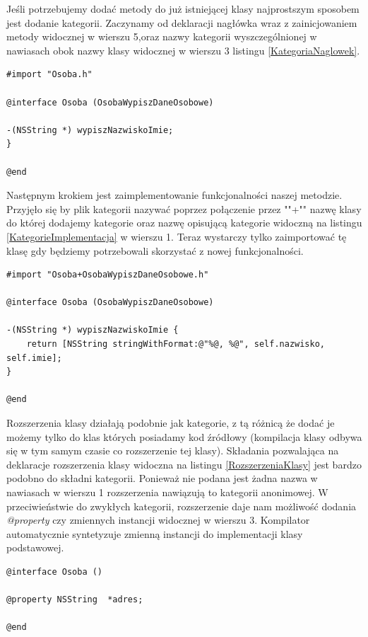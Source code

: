 \documentclass{iiuwb}
\begin{document}
Jeśli potrzebujemy dodać metody do już istniejącej klasy najprostszym sposobem jest dodanie kategorii. Zaczynamy od deklaracji nagłówka wraz z zainicjowaniem metody widocznej w wierszu 5,oraz nazwy kategorii wyszczególnionej w nawiasach obok nazwy klasy widocznej w wierszu 3 listingu \ref{KategoriaNaglowek}.
\begin{lstlisting}[label=KategoriaNaglowek, caption=Deklaracja nowej metody poprzez kategorie]
#import "Osoba.h"

@interface Osoba (OsobaWypiszDaneOsobowe)

-(NSString *) wypiszNazwiskoImie;
}

@end
\end{lstlisting}
Następnym krokiem jest zaimplementowanie funkcjonalności naszej metodzie. Przyjęło się by plik kategorii nazywać poprzez połączenie przez ""+"" nazwę klasy do której dodajemy kategorie oraz nazwę opisującą kategorie widoczną na listingu \ref{KategorieImplementacja} w wierszu 1. Teraz wystarczy tylko zaimportować tę klasę gdy będziemy potrzebowali skorzystać z nowej funkcjonalności.
\begin{lstlisting}[label=KategorieImplementacja, caption=Definicja metody kategorii]
#import "Osoba+OsobaWypiszDaneOsobowe.h"

@interface Osoba (OsobaWypiszDaneOsobowe)

-(NSString *) wypiszNazwiskoImie {
	return [NSString stringWithFormat:@"%@, %@", self.nazwisko, self.imie];
}

@end
\end{lstlisting}
Rozszerzenia klasy działają podobnie jak kategorie, z tą różnicą że dodać je możemy tylko do klas których posiadamy kod źródłowy (kompilacja klasy odbywa się w tym samym czasie co rozszerzenie tej klasy). Składania pozwalająca na deklaracje rozszerzenia klasy widoczna na listingu \ref{RozszerzeniaKlasy} jest bardzo podobno do składni kategorii. Ponieważ nie podana jest żadna nazwa w nawiasach w wierszu 1 rozszerzenia nawiązują to kategorii anonimowej. W przeciwieństwie do zwykłych kategorii, rozszerzenie daje nam możliwość dodania \textit{@property} czy zmiennych instancji widocznej w wierszu 3. Kompilator automatycznie syntetyzuje zmienną instancji do implementacji klasy podstawowej.

\begin{lstlisting}[label=RozszerzeniaKlasy, caption=Deklaracja nowego parametru poprzez rozszerzenie klasy bazowej]
@interface Osoba ()

@property NSString  *adres; 

@end
\end{lstlisting}
\end{document}

